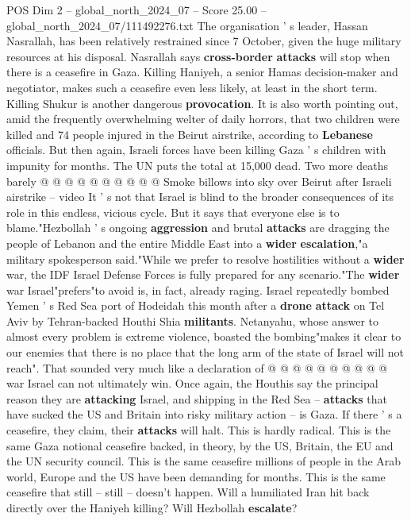 \begin{textsample}{POS Dim 2 – global\_north\_2024\_07 – Score 25.00 – global\_north\_2024\_07/111492276.txt}
The organisation ' s leader, Hassan Nasrallah, has been relatively restrained since 7 October, given the huge military resources at his disposal.
Nasrallah says \textbf{cross-border} \textbf{attacks} will stop when there is a ceasefire in Gaza.
Killing Haniyeh, a senior Hamas decision-maker and negotiator, makes such a ceasefire even less likely, at least in the short term.
Killing Shukur is another dangerous \textbf{provocation}.
It is also worth pointing out, amid the frequently overwhelming welter of daily horrors, that two children were killed and 74 people injured in the Beirut airstrike, according to \textbf{Lebanese} officials.
But then again, Israeli forces have been killing Gaza ' s children with impunity for months.
The UN puts the total at 15,000 dead.
Two more deaths barely @ @ @ @ @ @ @ @ @ @ Smoke billows into sky over Beirut after Israeli airstrike -- video It ' s not that Israel is blind to the broader consequences of its role in this endless, vicious cycle.
But it says that everyone else is to blame."Hezbollah ' s ongoing \textbf{aggression} and brutal \textbf{attacks} are dragging the people of Lebanon and the entire Middle East into a \textbf{wider} \textbf{escalation},"a military spokesperson said."While we prefer to resolve hostilities without a \textbf{wider} war, the IDF Israel Defense Forces is fully prepared for any scenario."The \textbf{wider} war Israel"prefers"to avoid is, in fact, already raging.
Israel repeatedly bombed Yemen ' s Red Sea port of Hodeidah this month after a \textbf{drone} \textbf{attack} on Tel Aviv by Tehran-backed Houthi Shia \textbf{militants}.
Netanyahu, whose answer to almost every problem is extreme violence, boasted the bombing"makes it clear to our enemies that there is no place that the long arm of the state of Israel will not reach".
That sounded very much like a declaration of @ @ @ @ @ @ @ @ @ @ war Israel can not ultimately win.
Once again, the Houthis say the principal reason they are \textbf{attacking} Israel, and shipping in the Red Sea -- \textbf{attacks} that have sucked the US and Britain into risky military action -- is Gaza.
If there ' s a ceasefire, they claim, their \textbf{attacks} will halt.
This is hardly radical.
This is the same Gaza notional ceasefire backed, in theory, by the US, Britain, the EU and the UN security council.
This is the same ceasefire millions of people in the Arab world, Europe and the US have been demanding for months.
This is the same ceasefire that still -- still -- doesn't happen.
Will a humiliated Iran hit back directly over the Haniyeh killing?
Will Hezbollah \textbf{escalate}?

\end{textsample}
